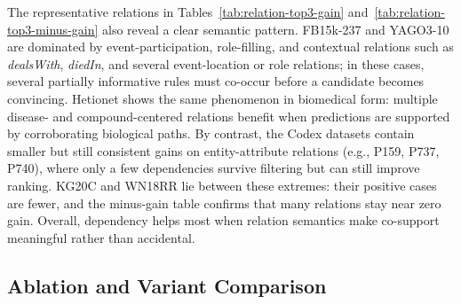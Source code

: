 The representative relations in Tables~\ref{tab:relation-top3-gain} and~\ref{tab:relation-top3-minus-gain} also reveal a clear semantic pattern. FB15k-237 and YAGO3-10 are dominated by event-participation, role-filling, and contextual relations such as \textit{dealsWith}, \textit{diedIn}, and several event-location or role relations; in these cases, several partially informative rules must co-occur before a candidate becomes convincing. Hetionet shows the same phenomenon in biomedical form: multiple disease- and compound-centered relations benefit when predictions are supported by corroborating biological paths. By contrast, the Codex datasets contain smaller but still consistent gains on entity-attribute relations (e.g., P159, P737, P740), where only a few dependencies survive filtering but can still improve ranking. KG20C and WN18RR lie between these extremes: their positive cases are fewer, and the minus-gain table confirms that many relations stay near zero gain. Overall, dependency helps most when relation semantics make co-support meaningful rather than accidental.


\subsection{Ablation and Variant Comparison}



